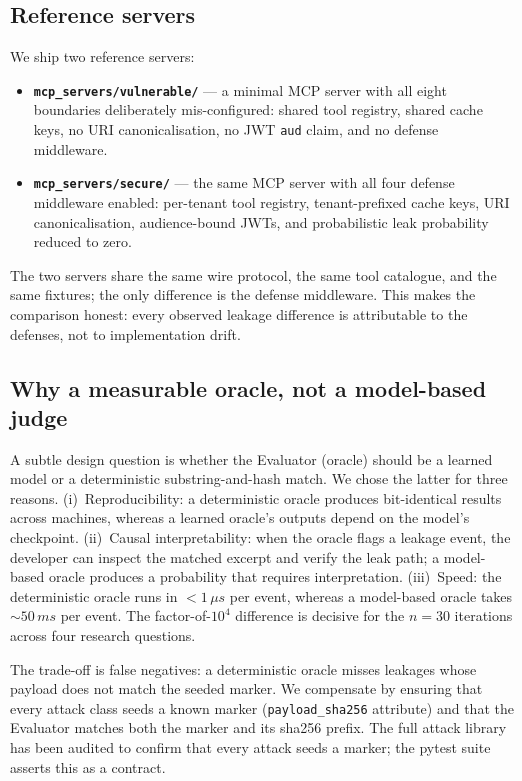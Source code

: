 \documentclass[sigconf, anonymous, natbib=false]{acmart}
\begin{document}
\subsection{Reference servers}

We ship two reference servers:

\begin{itemize}
  \item \textbf{\texttt{mcp\_servers/vulnerable/}} --- a
        minimal MCP server with all eight boundaries
        deliberately mis-configured: shared tool registry,
        shared cache keys, no URI canonicalisation, no JWT
        \texttt{aud} claim, and no defense middleware.
  \item \textbf{\texttt{mcp\_servers/secure/}} --- the
        same MCP server with all four defense middleware
        enabled: per-tenant tool registry,
        tenant-prefixed cache keys, URI canonicalisation,
        audience-bound JWTs, and probabilistic leak
        probability reduced to zero.
\end{itemize}

The two servers share the same wire protocol, the same
tool catalogue, and the same fixtures; the only difference
is the defense middleware. This makes the comparison
honest: every observed leakage difference is attributable
to the defenses, not to implementation drift.

\subsection{Why a measurable oracle, not a model-based judge}

A subtle design question is whether the Evaluator (oracle)
should be a learned model or a deterministic
substring-and-hash match. We chose the latter for three
reasons. (i)~Reproducibility: a deterministic oracle
produces bit-identical results across machines, whereas a
learned oracle's outputs depend on the model's checkpoint.
(ii)~Causal interpretability: when the oracle flags a
leakage event, the developer can inspect the matched
excerpt and verify the leak path; a model-based oracle
produces a probability that requires interpretation.
(iii)~Speed: the deterministic oracle runs in $< 1\,\mu
s$ per event, whereas a model-based oracle takes $\sim
50\,ms$ per event. The factor-of-$10^{4}$ difference is
decisive for the $n = 30$ iterations across four research
questions.

The trade-off is false negatives: a deterministic oracle
misses leakages whose payload does not match the seeded
marker. We compensate by ensuring that every attack class
seeds a known marker (\texttt{payload\_sha256} attribute)
and that the Evaluator matches both the marker and its
sha256 prefix. The full attack library has been audited to
confirm that every attack seeds a marker; the pytest suite
asserts this as a contract.
\end{document}
